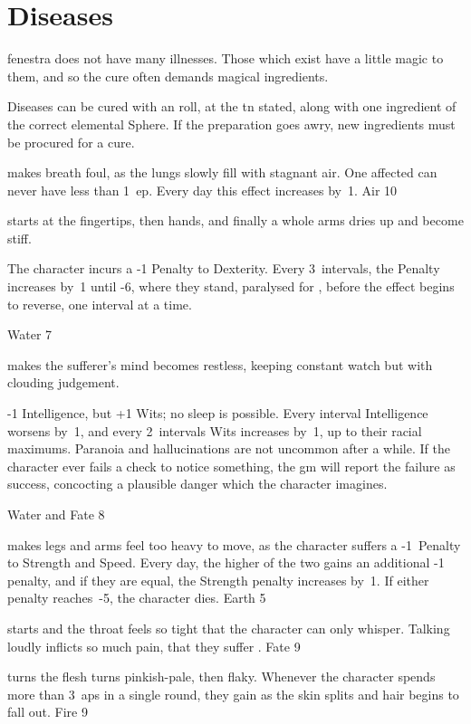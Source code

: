 \section[Diseases]{Diseases~}
\label{diseases}

\begin{multicols}{2}
\renewcommand\npcsymbol{\glssymbol{eldren}}

\noindent
\Gls{fenestra} does not have many illnesses.
Those which exist have a little magic to them, and so the cure often demands magical \glspl{ingredient}.

Diseases can be cured with an  roll, at the \gls{tn} stated, along with one \gls{ingredient} of the correct elemental Sphere.
If the preparation goes awry, new \glspl{ingredient} must be procured for a cure.

%
  {makes breath foul, as the lungs slowly fill with stagnant air.
    One affected can never have less than 1~\gls{ep}.
    Every day this effect increases by~1.
  }%
  {Air}%
  {10}

%
  {starts at the fingertips, then hands, and finally a whole arms dries up and become stiff.

    The character incurs a -1 Penalty to Dexterity.
    Every 3~\glspl{interval}, the Penalty increases by~1 until -6, where they stand, paralysed for , before the effect begins to reverse, one \gls{interval} at a time.}%
  {Water}%
  {7}

%
  {makes the sufferer's mind becomes restless, keeping constant watch but with clouding judgement.

    -1 Intelligence, but +1 Wits; no sleep is possible.
    Every \gls{interval} Intelligence worsens by~1, and every 2~\glspl{interval} Wits increases by~1, up to their racial maximums.%
    Paranoia and hallucinations are not uncommon after a while.
    If the character ever fails a check to notice something, the \gls{gm} will report the failure as success, concocting a plausible danger which the character imagines.}%
  {Water and Fate}%
  {8}

%
  {makes legs and arms feel too heavy to move, as the character suffers a -1~Penalty to Strength and Speed.
  Every day, the higher of the two gains an additional -1 penalty, and if they are equal, the Strength penalty increases by~1.
  If either penalty reaches~-5, the character dies.}%
  {Earth}%
  {5}

%
  {starts and the throat feels so tight that the character can only whisper.
  Talking loudly inflicts so much pain, that they suffer .}%
  {Fate}%
  {9}

%
  {turns the flesh turns pinkish-pale, then flaky.
  Whenever the character spends more than 3~\glspl{ap} in a single round, they gain  as the skin splits and hair begins to fall out.}%
  {Fire}%
  {9}

\end{multicols}
